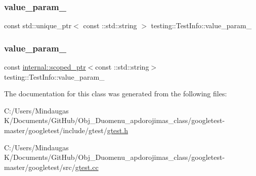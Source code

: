 \subsubsection{\texorpdfstring{value\_param\_}{value\_param\_}\hspace{0.1cm}{\footnotesize\ttfamily [1/2]}}
{\footnotesize\ttfamily const std\+::unique\+\_\+ptr$<$ const \+::std\+::string $>$ testing\+::\+Test\+Info\+::value\+\_\+param\+\_\+\hspace{0.3cm}{\ttfamily [private]}}

\mbox{\label{classtesting_1_1_test_info_ac3dd68ea96ebe82c6eab31e6e730a918}} 
\subsubsection{\texorpdfstring{value\_param\_}{value\_param\_}\hspace{0.1cm}{\footnotesize\ttfamily [2/2]}}
{\footnotesize\ttfamily const \mbox{\hyperlink{classtesting_1_1internal_1_1scoped__ptr}{internal\+::scoped\+\_\+ptr}}$<$const \+::std\+::string$>$ testing\+::\+Test\+Info\+::value\+\_\+param\+\_\+\hspace{0.3cm}{\ttfamily [private]}}



The documentation for this class was generated from the following files\+:\begin{DoxyCompactItemize}
\item 
C\+:/\+Users/\+Mindaugas K/\+Documents/\+Git\+Hub/\+Obj\+\_\+\+Duomenu\+\_\+apdorojimas\+\_\+class/googletest-\/master/googletest/include/gtest/\mbox{\hyperlink{googletest-master_2googletest_2include_2gtest_2gtest_8h}{gtest.\+h}}\item 
C\+:/\+Users/\+Mindaugas K/\+Documents/\+Git\+Hub/\+Obj\+\_\+\+Duomenu\+\_\+apdorojimas\+\_\+class/googletest-\/master/googletest/src/\mbox{\hyperlink{googletest-master_2googletest_2src_2gtest_8cc}{gtest.\+cc}}\end{DoxyCompactItemize}
